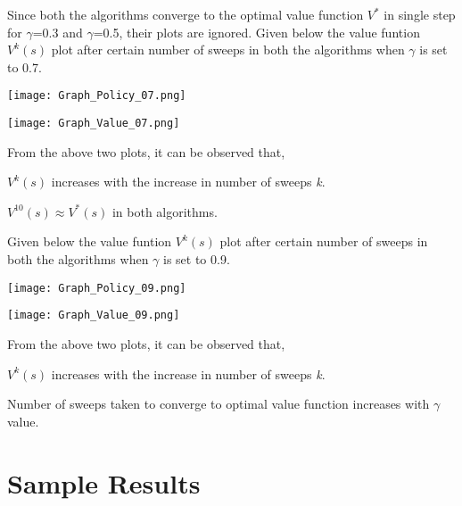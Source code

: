 \documentclass[a4paper,10pt]{report}
\newenvironment{my_itemize}{
\begin{itemize}
  \setlength{\itemsep}{1pt}
  \setlength{\parskip}{0pt}
  \setlength{\parsep}{0pt}}{
\end{itemize}}
\begin{document}
Since both the algorithms converge to the optimal value function $V^{*}$ in single step for $\gamma$=0.3 and $\gamma$=0.5, their plots are ignored.
Given below the value funtion $V^{k}(s)$ plot after certain number of sweeps in both the algorithms when $\gamma$ is set to 0.7.
\begin{center}
\centerline{\texttt{[image: Graph\_Policy\_07.png]}}
\end{center}
\begin{center}
\centerline{\texttt{[image: Graph\_Value\_07.png]}}
\end{center}
From the above two plots, it can be observed that,
\begin{my_itemize}
 \item $V^{k}(s)$ increases with the increase in number of sweeps \emph{k}.
 \item $V^{10}(s) \approx V^{*}(s)$ in both algorithms.
\end{my_itemize}

Given below the value funtion $V^{k}(s)$ plot after certain number of sweeps in both the algorithms when $\gamma$ is set to 0.9.
\begin{center}
\centerline{\texttt{[image: Graph\_Policy\_09.png]}}
\end{center}
\begin{center}
\centerline{\texttt{[image: Graph\_Value\_09.png]}}
\end{center}
From the above two plots, it can be observed that,
\begin{my_itemize}
 \item $V^{k}(s)$ increases with the increase in number of sweeps \emph{k}.
 \item Number of sweeps taken to converge to optimal value function increases with $\gamma$ value. 
\end{my_itemize}

\section{Sample Results}
\end{document}
